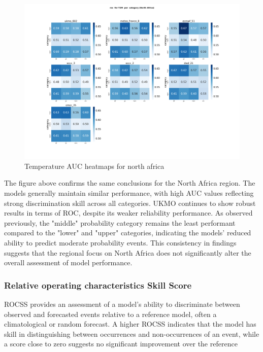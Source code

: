 \begin{figure}[H]
    \centering
    \includegraphics[width=1\linewidth]{plots/prob/roc/roc_T2M_category_NorthAfrica.png}
    \caption{Temperature AUC  heatmaps for north africa }
\end{figure}
The figure above confirms the same conclusions for the North Africa region. The models generally maintain similar performance, with high AUC values reflecting strong discrimination skill across all categories. UKMO continues to show robust results in terms of ROC, despite its weaker reliability performance. As observed previously, the "middle" probability category remains the least performant compared to the "lower" and "upper" categories, indicating the models' reduced ability to predict moderate probability events. This consistency in findings suggests that the regional focus on North Africa does not significantly alter the overall assessment of model performance.
\subsubsection{Relative operating characteristics Skill Score}
ROCSS provides an assessment of a model's ability to discriminate between observed and forecasted events relative to a reference model, often a climatological or random forecast. A higher ROCSS indicates that the model has skill in distinguishing between occurrences and non-occurrences of an event, while a score close to zero suggests no significant improvement over the reference

